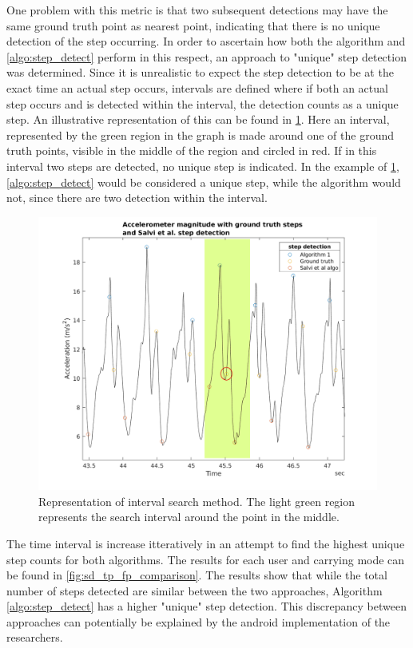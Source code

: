 One problem with this metric is that two subsequent detections may have the same ground truth point as nearest point, indicating that there is no unique detection of the step occurring. In order to ascertain how both the \citet{Salvi2018} algorithm and \cref{algo:step_detect} perform in this respect, an approach to "unique" step detection was determined. Since it is unrealistic to expect the step detection to be at the exact time an actual step occurs, intervals are defined where if both an actual step occurs and is detected within the interval, the detection counts as a unique step. An illustrative representation of this can be found in \cref{fig:202011121558_true_positive_example_1}. Here an interval, represented by the green region in the graph is made around one of the ground truth points, visible in the middle of the region and circled in red. If in this interval two steps are detected, no unique step is indicated. In the example of  \cref{fig:202011121558_true_positive_example_1},  \cref{algo:step_detect} would be considered a unique step, while the \citet{Salvi2018} algorithm would not, since there are two detection within the interval.

\begin{figure}
	\centering
	\includegraphics[width=0.75\linewidth]{images/20201112_1809_true_positive_example_2}
	\caption{Representation of interval search method. The light green region represents the search interval around the \citet{Salvi2018} point in the middle.}
	\label{fig:202011121558_true_positive_example_1}
\end{figure}

The time interval is increase itteratively in an attempt to find the highest unique step counts for both algorithms. The results for each user and carrying mode can be found in \cref{fig:sd_tp_fp_comparison}. The results show that while the total number of steps detected are similar between the two approaches, Algorithm \ref{algo:step_detect} has a higher "unique" step detection. This discrepancy between approaches can potentially be explained by the android implementation of the researchers. 

